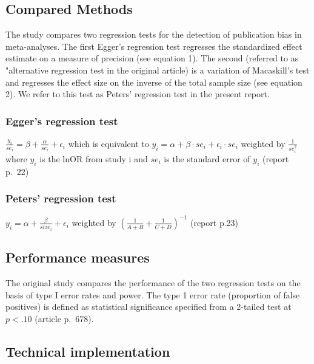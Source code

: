 \documentclass[
  english,
  doc,floatsintext,draftall]{apa6}
\begin{document}
\hypertarget{compared-methods}{%
\subsection{Compared Methods}\label{compared-methods}}

The study compares two regression tests for the detection of publication bias in meta-analyses.
The first Egger's regression test regresses the standardized effect estimate on a measure of precision (see equation 1).
The second (referred to as "alternative regression test in the original article) is a variation of Macaskill's test and regresses the effect size on the inverse of the total sample size (see equation 2).
We refer to this test as Peters' regression test in the present report.

\hypertarget{eggers-regression-test}{%
\subsubsection{Egger's regression test}\label{eggers-regression-test}}

\(\frac{y_i}{se_i}= \beta + \frac{\alpha}{se_i}+\epsilon_i\) which is equivalent to
\(y_i = \alpha +\beta \cdot se_i +\epsilon_i \cdot se_i\) weighted by \(\frac{1}{se_i^2}\)
where \(y_i\) is the lnOR from study i and \(se_i\) is the standard error of \(y_i\)
(report p.~22)

\hypertarget{peters-regression-test}{%
\subsubsection{Peters' regression test}\label{peters-regression-test}}

\(y_i = \alpha +\frac{\beta}{size_i} + \epsilon_i\) weighted by \((\frac{1}{A+B}+\frac{1}{C+D})^{-1}\)
(report p.23)

\hypertarget{performance-measures}{%
\subsection{Performance measures}\label{performance-measures}}

The original study compares the performance of the two regression tests on the basis of type I error rates and power.
The type 1 error rate (proportion of false positives) is defined as statistical significance specified from a 2-tailed test at \(p<.10\) (article p.~678).

\hypertarget{technical-implementation}{%
\subsection{Technical implementation}\label{technical-implementation}}
\end{document}
